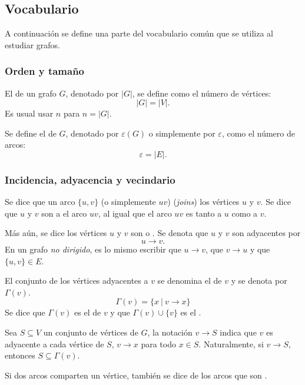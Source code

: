 \subsection{Vocabulario}

A continuación se define una parte del vocabulario común que se utiliza al estudiar grafos.

\subsubsection{Orden y tamaño}

El  de un grafo \(G\), denotado por \(|G|\), se define como el número de vértices: \[|G| = |V|.\] Es usual usar \(n\) para \(n = |G|\).

Se define el  de \(G\), denotado por \(\varepsilon(G)\) o simplemente por \(\varepsilon\), como el número de arcos: \[\varepsilon = |E|.\]

\subsubsection{Incidencia, adyacencia y vecindario}
\label{sec:adyacencia}

Se dice que un arco \(\{u,v\}\) (o simplemente \(uv\))  (\textit{joins}) los vértices \(u\) y \(v\). Se dice que \(u\) y \(v\) son  a el arco \(uv\), al igual que el arco \(uv\) es  tanto a \(u\) como a \(v\).

Más aún, se dice los vértices \(u\) y \(v\) son  o . Se denota que \(u\) y \(v\) son adyacentes por \[u \longrightarrow v.\]
En un grafo \emph{no dirigido}, es lo mismo escribir que \(u\longrightarrow v\), que \(v \longrightarrow u\) y que \(\{u,v\} \in E\).

El conjunto de los vértices adyacentes a \(v\) se denomina el  de \(v\) y se denota por \(\Gamma(v)\). \[\Gamma(v) = \{x \ | \ v \longrightarrow x\}\] Se dice que \(\Gamma(v)\) es el  de \(v\) y que \(\Gamma(v) \cup \{v\}\) es el .

Sea \(S \subseteq V\) un conjunto de vértices de \(G\), la notación \(v\longrightarrow S\) indica que \(v\) es adyacente a cada vértice de \(S\), \(v\longrightarrow x\) para todo \(x \in S\). Naturalmente, si \(v \longrightarrow S\), entonces \(S \subseteq \Gamma(v)\).

Si dos arcos comparten un vértice, también se dice de los arcos que son .

